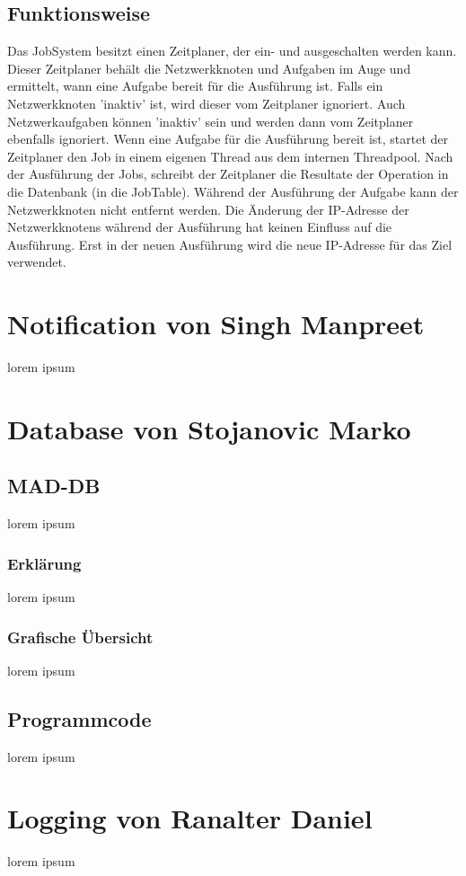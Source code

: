 \documentclass[11pt,a4paper]{report}
\begin{document}
\section{Funktionsweise}

Das JobSystem besitzt einen Zeitplaner, der ein- und ausgeschalten werden kann. Dieser Zeitplaner behält die Netzwerkknoten und Aufgaben im Auge und ermittelt, wann eine Aufgabe bereit für die Ausführung ist. Falls ein Netzwerkknoten 'inaktiv' ist, wird dieser vom Zeitplaner ignoriert. Auch Netzwerkaufgaben können 'inaktiv' sein und werden dann vom Zeitplaner ebenfalls ignoriert. Wenn eine Aufgabe für die Ausführung bereit ist, startet der Zeitplaner den Job in einem eigenen Thread aus dem internen Threadpool. Nach der Ausführung der Jobs, schreibt der Zeitplaner die Resultate der Operation in die Datenbank (in die JobTable). Während der Ausführung der Aufgabe kann der Netzwerkknoten nicht entfernt werden. Die Änderung der IP-Adresse der Netzwerkknotens während der Ausführung hat keinen Einfluss auf die Ausführung. Erst in der neuen Ausführung wird die neue IP-Adresse für das Ziel verwendet.

\chapter{Notification von Singh Manpreet}
lorem ipsum

\chapter{Database von Stojanovic Marko}
\section{MAD-DB}
lorem ipsum
\subsection{Erklärung}
lorem ipsum
\subsection{Grafische Übersicht}
lorem ipsum
\section{Programmcode}
lorem ipsum

\chapter{Logging von Ranalter Daniel}
lorem ipsum
\end{document}
